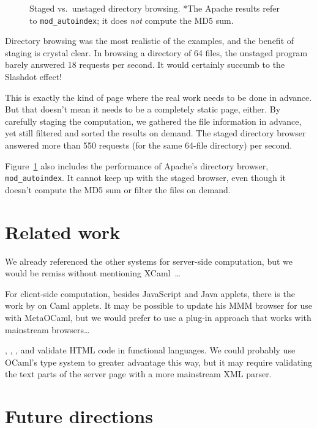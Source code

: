 \documentclass[preprint]{acm_proc_article-sp}
\def\MOC{MetaOCaml}
\newcommand{\myfig}[3]{%
  \begin{figure}[tbp]%
    #3%
    \caption{#2}%
    \label{fig:#1}%
  \end{figure}}
\newcommand{\gnuplot}[2]{%
  \myfig{#1}{#2}{}}
\begin{document}
\gnuplot{browse}{Staged vs.~unstaged directory browsing.  *The
  Apache results refer to \texttt{mod\_autoindex}; it does
  \emph{not} compute the MD5 sum.}

Directory browsing was the most realistic of the examples, and
the benefit of staging is crystal clear.  In browsing a
directory of 64 files, the unstaged program barely answered 18
requests per second.  It would certainly succumb to the Slashdot
effect!

This is exactly the kind of page where the real work needs to be
done in advance.  But that doesn't mean it needs to be a
completely static page, either.  By carefully staging the
computation, we gathered the file information in advance, yet
still filtered and sorted the results on demand.  The staged
directory browser answered more than 550 requests (for the same
64-file directory) per second.

Figure~\ref{fig:browse} also includes the performance of
Apache's directory browser, \texttt{mod\_autoindex}.  It cannot
keep up with the staged browser, even though it doesn't compute
the MD5 sum or filter the files on demand.

\section{Related work}
\label{sec:related}

We already referenced the other systems for server-side
computation, but we would be remiss without mentioning
XCaml~\cite{baretta04xcaml}\ldots

For client-side computation, besides JavaScript and Java
applets, there is the work by \citet{rouaix96web} on Caml
applets.  It may be possible to update his MMM browser for use
with \MOC{}, but we would prefer to use a plug-in approach that
works with mainstream browsers\ldots

\citet{elsman04typing}, \citet{wallace99haxml},
\citet{hosoya03xduce}, and \citet{ohl04xhtml} validate HTML code
in functional languages.  We could probably use OCaml's type
system to greater advantage this way, but it may require
validating the text parts of the server page with a more
mainstream XML parser.

\newpage
\section{Future directions}
\label{sec:future}
\end{document}
